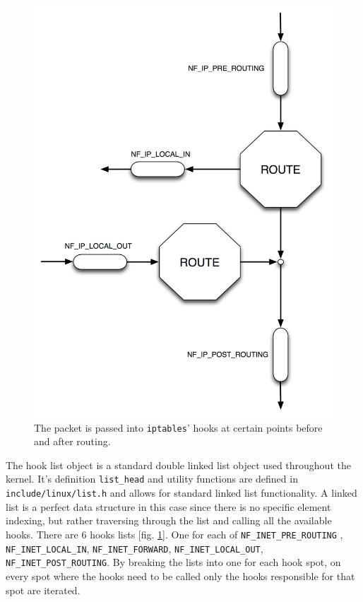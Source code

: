 \documentclass[a4paper,10pt]{article}
\newcommand{\code}[1]{\texttt{{#1}}}
\newcommand{\figref}[1]{[fig. \ref{#1}]}
\begin{document}
\begin{figure}
\centering
\includegraphics[totalheight=0.40\textheight]{images/hooks.png}
\caption{The packet is passed into \code{iptables}' hooks at certain points
  before and after routing.}\label{fig:hooks}
\end{figure}

The hook list object is a standard double linked list object used throughout the kernel. It's definition \verb|list_head| and utility functions are defined in \verb|include/linux/list.h| and allows for standard linked list functionality. A linked list is a perfect data structure in this case since there is no specific element indexing, but rather traversing through the list and calling all the available hooks. There are 6 hooks lists \figref{fig:hooks}. One for each of \verb|NF_INET_PRE_ROUTING| , \verb|NF_INET_LOCAL_IN|, \verb|NF_INET_FORWARD|, \verb|NF_INET_LOCAL_OUT|, \verb|NF_INET_POST_ROUTING|. By breaking the lists into one for each hook spot, on every spot where the hooks need to be called only the hooks responsible for that spot are iterated.
\end{document}
